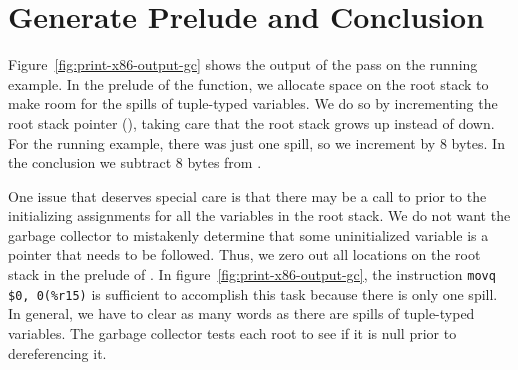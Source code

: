 \documentclass[7x10]{TimesAPriori_MIT}%
\numberwithin{theorem}{chapter}
\numberwithin{definition}{chapter}
\numberwithin{equation}{chapter}
\begin{document}
\section{Generate Prelude and Conclusion}
\label{sec:print-x86-gc}
\label{sec:prelude-conclusion-x86-gc}

Figure~\ref{fig:print-x86-output-gc} shows the output of the
 pass on the running example. In the
prelude of the  function, we allocate space
on the root stack to make room for the spills of tuple-typed
variables. We do so by incrementing the root stack pointer (),
taking care that the root stack grows up instead of down.  For the
running example, there was just one spill, so we increment 
by 8 bytes. In the conclusion we subtract 8 bytes from .

One issue that deserves special care is that there may be a call to
 prior to the initializing assignments for all the
variables in the root stack. We do not want the garbage collector to
mistakenly determine that some uninitialized variable is a pointer that
needs to be followed. Thus, we zero out all locations on the root
stack in the prelude of . In
figure~\ref{fig:print-x86-output-gc}, the instruction
%
\lstinline{movq $0, 0(%r15)}
%
is sufficient to accomplish this task because there is only one spill.
In general, we have to clear as many words as there are spills of
tuple-typed variables. The garbage collector tests each root to see
if it is null prior to dereferencing it. 
\end{document}

